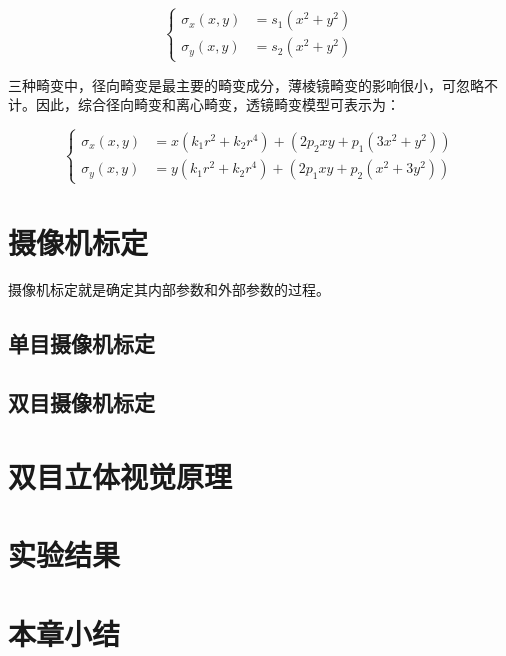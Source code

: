 \begin{equation}\label{eq:2_1_thin_prism_distortion}
\left\{
\begin{aligned}
\sigma_x(x,y) &= s_1 (x^2 + y^2) \\
\sigma_y(x,y) &= s_2 (x^2 + y^2)
\end{aligned}
\right.
\end{equation}

三种畸变中，径向畸变是最主要的畸变成分，薄棱镜畸变的影响很小，可忽略不计。因此，综合径向畸变和离心畸变，透镜畸变模型可表示为：

\begin{equation}\label{eq:2_1_radial_distortion}
\left\{
\begin{aligned}
\sigma_x(x,y) &= x(k_1 r^2 + k_2 r^4) + (2p_2 xy + p_1 (3x^2 + y^2))  \\
\sigma_y(x,y) &= y(k_1 r^2 + k_2 r^4)  + (2p_1 xy + p_2 (x^2 + 3y^2))
\end{aligned}
\right.
\end{equation}


\section{摄像机标定}
摄像机标定就是确定其内部参数和外部参数的过程。
\subsection{单目摄像机标定}
\subsection{双目摄像机标定}

\section{双目立体视觉原理}

\section{实验结果}

\section{本章小结}

